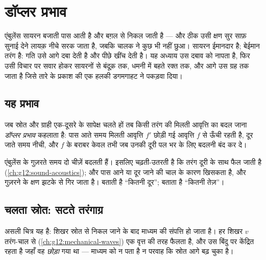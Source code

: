 \chapter{डॉप्लर प्रभाव}\label{ch:g12:doppler-effect}

एंबुलेंस सायरन बजाती पास आती है और बग़ल से निकल जाती है --- और ठीक उसी क्षण सुर
साफ़ सुनाई देने लायक़ नीचे सरक जाता है, जबकि चालक ने कुछ भी नहीं छुआ। सायरन
ईमानदार है; बेईमान तरंग है: गति उसे आगे दबा देती है और पीछे खींच देती
है। यह अध्याय उस दबाव को नापता है, फिर उसी विचार पर सवार होकर सायरनों से
 बंदूक़ तक, धमनी में बहते रक्त तक, और आगे उस ग्रह तक जाता है जिसे
तारे के प्रकाश की एक हलकी डगमगाहट ने पकड़वा दिया।

\section{यह प्रभाव}

\begin{definition}[डॉप्लर प्रभाव]\label{def:g12:doppler-effect:doppler}
जब स्रोत और ग्राही एक-दूसरे के सापेक्ष चलते हों तब किसी तरंग की मिलती
आवृत्ति का बदल जाना \emph{डॉप्लर प्रभाव} कहलाता
है: पास आते समय मिलती आवृत्ति $f'$ छोड़ी गई आवृत्ति $f$ से
ऊँची रहती है, दूर जाते समय नीची, और $f$ के बराबर केवल तभी जब उनकी दूरी पल
भर के लिए बदलनी बंद कर दे।
\end{definition}

\begin{remark}[तारत्व, प्रबलता नहीं]\label{rem:g12:doppler-effect:pitch}
एंबुलेंस के गुज़रते समय दो चीज़ें बदलती हैं। \emph{} इसलिए
चढ़ती-उतरती है कि तरंग दूरी के साथ फैल जाती है (\cref{ch:g12:sound-acoustics}); और
\emph{} पास आने या दूर जाने की चाल के कारण खिसकता है, और गुज़रने
के क्षण झटके से गिर जाता है।  बताती है ``कितनी दूर'';
 बताता है ``कितनी तेज़''।
\end{remark}

\section{चलता स्रोत: सटते तरंगाग्र}

असली चित्र यह है: शिखर स्रोत से निकल जाने के बाद माध्यम की संपत्ति हो जाता है।
हर शिखर $v$ तरंग-चाल से (\cref{ch:g12:mechanical-waves}) एक वृत्त की तरह फैलता है, और उस
बिंदु पर केंद्रित रहता है जहाँ वह \emph{छोड़ा} गया था --- माध्यम को न पता है न
परवाह कि स्रोत आगे बढ़ चुका है।

